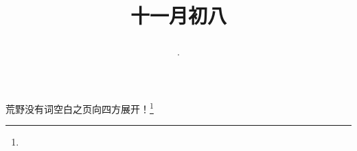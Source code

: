 \title{\date[d=8,m=12,y=2024][year:cn-y,年,month:cn,day:cn,日,·,weekday]·十一月初八 }
荒野没有词空白之页向四方展开！\footnote{ }

